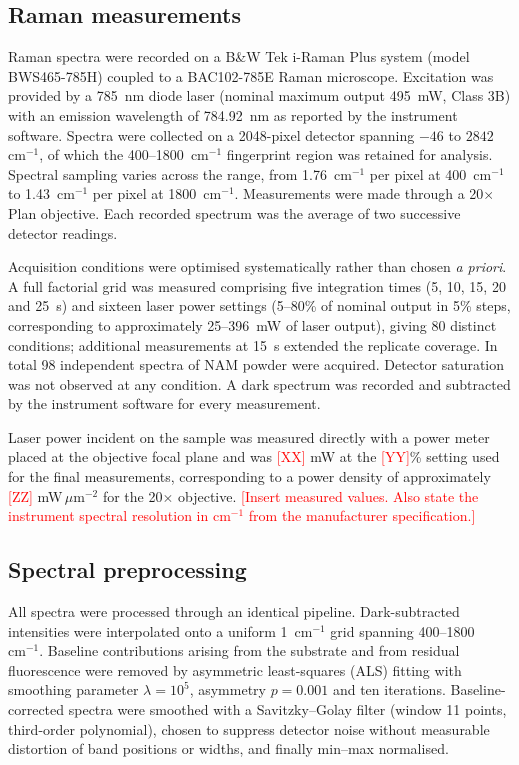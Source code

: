 \documentclass[11pt,a4paper]{article}
\newcommand{\wn}{\ensuremath{\mathrm{cm}^{-1}}}
\newcommand{\authorcheck}[1]{\textcolor{red}{[#1]}}
\begin{document}
\subsection{Raman measurements}

Raman spectra were recorded on a B\&W Tek i-Raman Plus system (model
BWS465-785H) coupled to a BAC102-785E Raman microscope. Excitation was provided
by a 785~nm diode laser (nominal maximum output 495~mW, Class 3B) with an
emission wavelength of 784.92~nm as reported by the instrument software.
Spectra were collected on a 2048-pixel detector spanning $-46$ to
$2842$~\wn{}, of which the 400--1800~\wn{} fingerprint region was retained for
analysis. Spectral sampling varies across the range, from 1.76~\wn{} per pixel
at 400~\wn{} to 1.43~\wn{} per pixel at 1800~\wn{}. Measurements were made through a
20$\times$ Plan objective. Each recorded spectrum was the average of two
successive detector readings.

Acquisition conditions were optimised systematically rather than chosen
\emph{a priori}. A full factorial grid was measured comprising five integration
times (5, 10, 15, 20 and 25~s) and sixteen laser power settings (5--80\% of
nominal output in 5\% steps, corresponding to approximately 25--396~mW of laser
output), giving 80 distinct conditions; additional measurements at 15~s extended
the replicate coverage. In total 98 independent spectra of NAM powder were
acquired. Detector saturation was not observed at any condition. A dark
spectrum was recorded and subtracted by the instrument software for every
measurement.

Laser power incident on the sample was measured directly with a power meter
placed at the objective focal plane and was \authorcheck{XX} mW at the
\authorcheck{YY}\% setting used for the final measurements, corresponding to a
power density of approximately \authorcheck{ZZ} mW\,$\mu$m$^{-2}$ for the
20$\times$ objective. \authorcheck{Insert measured values. Also state the
instrument spectral resolution in \wn{} from the manufacturer specification.}

\subsection{Spectral preprocessing}

All spectra were processed through an identical pipeline. Dark-subtracted
intensities were interpolated onto a uniform 1~\wn{} grid spanning
400--1800~\wn{}. Baseline contributions arising from the substrate and from
residual fluorescence were removed by asymmetric least-squares (ALS) fitting \cite{eilers2005}
with smoothing parameter $\lambda = 10^{5}$, asymmetry $p = 0.001$ and ten
iterations. Baseline-corrected spectra were smoothed with a
Savitzky--Golay filter \cite{savitzky1964} (window 11 points, third-order
polynomial), chosen to
suppress detector noise without measurable distortion of band positions or
widths, and finally min--max normalised.
\end{document}

